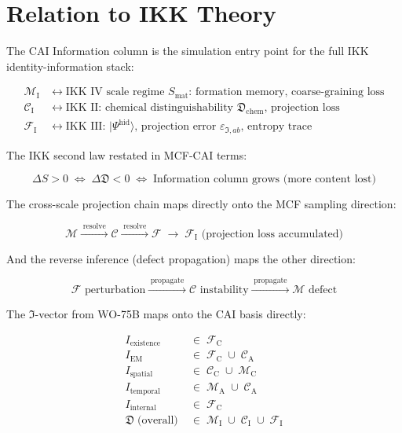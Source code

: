 \documentclass[11pt, a4paper, oneside]{article}
\theoremstyle{definition}
\theoremstyle{plain}
\theoremstyle{remark}
\newcommand{\Macro}{\mathscr{M}}          %
\newcommand{\Chem}{\mathscr{C}}           %
\newcommand{\Fund}{\mathscr{F}}           %
\newcommand{\MC}{\Macro_{\mathrm{C}}}
\newcommand{\MA}{\Macro_{\mathrm{A}}}
\newcommand{\MI}{\Macro_{\mathrm{I}}}
\newcommand{\CC}{\Chem_{\mathrm{C}}}
\newcommand{\CA}{\Chem_{\mathrm{A}}}
\newcommand{\CI}{\Chem_{\mathrm{I}}}
\newcommand{\FC}{\Fund_{\mathrm{C}}}
\newcommand{\FI}{\Fund_{\mathrm{I}}}
\newcommand{\Dfrak}{\mathfrak{D}}
\newcommand{\Ifrak}{\mathfrak{I}}
\newcommand{\Psihid}{|\Psi^{\mathrm{hid}}\rangle}
\begin{document}
\section{Relation to IKK Theory}

The CAI Information column is the simulation entry point for the full IKK
identity-information stack:

\begin{align*}
  \MI &\longleftrightarrow \text{IKK IV scale regime } S_{\mathrm{mat}}\text{: formation memory, coarse-graining loss} \\
  \CI &\longleftrightarrow \text{IKK II: chemical distinguishability } \Dfrak_{\mathrm{chem}}\text{, projection loss} \\
  \FI &\longleftrightarrow \text{IKK III: } \Psihid\text{, projection error } \varepsilon_{\mathfrak{I},ab}\text{, entropy trace}
\end{align*}

The IKK second law restated in MCF-CAI terms:

\[
  \Delta S > 0 \;\Longleftrightarrow\; \Delta\Dfrak < 0
  \;\Longleftrightarrow\;
  \text{Information column grows (more content lost)}
\]

The cross-scale projection chain maps directly onto the MCF sampling direction:

\[
  \Macro \xrightarrow{\;\text{resolve}\;} \Chem \xrightarrow{\;\text{resolve}\;} \Fund
  \;\longrightarrow\; \FI\text{ (projection loss accumulated)}
\]

And the reverse inference (defect propagation) maps the other direction:

\[
  \Fund\text{ perturbation} \xrightarrow{\;\text{propagate}\;} \Chem\text{ instability}
  \xrightarrow{\;\text{propagate}\;} \Macro\text{ defect}
\]

The $\Ifrak$-vector from WO-75B maps onto the CAI basis directly:

\begin{align*}
  I_{\mathrm{existence}} &\;\in\; \FC \\
  I_{\mathrm{EM}}        &\;\in\; \FC \;\cup\; \CA \\
  I_{\mathrm{spatial}}   &\;\in\; \CC \;\cup\; \MC \\
  I_{\mathrm{temporal}}  &\;\in\; \MA \;\cup\; \CA \\
  I_{\mathrm{internal}}  &\;\in\; \FC \\
  \Dfrak\;\text{(overall)}&\;\in\; \MI \;\cup\; \CI \;\cup\; \FI
\end{align*}
\end{document}
